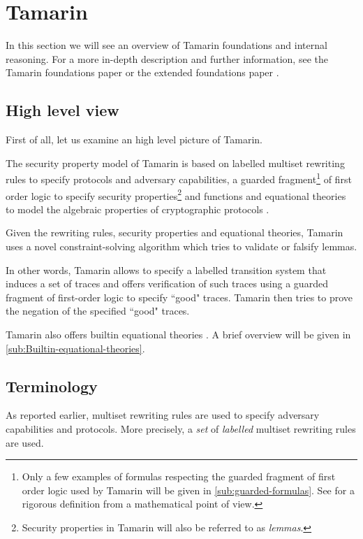 \section{Tamarin}
In this section we will see an overview of Tamarin foundations and internal reasoning.
For a more in-depth description and further information, see the Tamarin foundations paper \cite{TamarinFoundations} or the extended foundations paper \cite{TamarinFoundationsExtended}.

\subsection{High level view}
First of all, let us examine an high level picture of Tamarin.

The security property model of Tamarin is based on labelled multiset rewriting rules to specify protocols and adversary capabilities, a guarded fragment\footnote{Only a few examples of formulas respecting the guarded fragment of first order logic used by Tamarin will be given in \cref{sub:guarded-formulas}. See \cite{FragmentFirstOrderLogicPaper} for a rigorous definition from a mathematical point of view.} of first order logic to specify security properties\footnote{Security properties in Tamarin will also be referred to as \textit{lemmas}.} and functions and equational theories to model the algebraic properties of cryptographic protocols \cite{TamarinFoundations}.

Given the rewriting rules, security properties and equational theories, Tamarin uses a novel constraint-solving algorithm which tries to validate or falsify lemmas.

In other words, Tamarin allows to specify a labelled transition system that induces a set of traces and offers verification of such traces using a guarded fragment of first-order logic to specify ``good" traces. Tamarin then tries to prove the negation of the specified ``good" traces.

Tamarin also offers builtin equational theories \cite{TamarinProverManual}. A brief overview will be given in \cref{sub:Builtin-equational-theories}.

\subsection{Terminology}
As reported earlier, multiset rewriting rules are used to specify adversary capabilities and protocols. More precisely, a \textit{set} of \textit{labelled} multiset rewriting rules are used.


